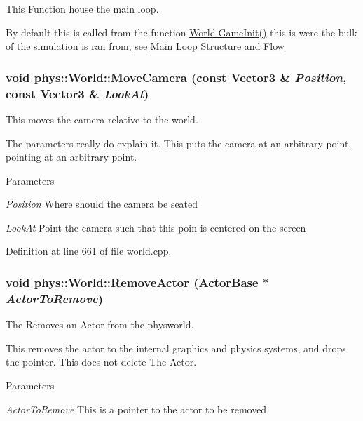 This Function house the main loop. 

By default this is called from the function \hyperlink{classphys_1_1World_a21cc36be08a61f40619584d4c438936b}{World.GameInit()} this is were the bulk of the simulation is ran from, see \hyperlink{mainloop1}{Main Loop Structure and Flow} \hypertarget{classphys_1_1World_aed87ebc1e559c3057132c50bba16117f}{
\subsubsection[{MoveCamera}]{\setlength{\rightskip}{0pt plus 5cm}void phys::World::MoveCamera (const {\bf Vector3} \& {\em Position}, \/  const {\bf Vector3} \& {\em LookAt})}}
\label{da/ddf/classphys_1_1World_aed87ebc1e559c3057132c50bba16117f}


This moves the camera relative to the world. 

The parameters really do explain it. This puts the camera at an arbitrary point, pointing at an arbitrary point. 
\begin{DoxyParams}{Parameters}
\item[{\em Position}]Where should the camera be seated \item[{\em LookAt}]Point the camera such that this poin is centered on the screen \end{DoxyParams}


Definition at line 661 of file world.cpp.

\hypertarget{classphys_1_1World_ab00f84983afcc7f6ef1e5a84367d994d}{
\subsubsection[{RemoveActor}]{\setlength{\rightskip}{0pt plus 5cm}void phys::World::RemoveActor ({\bf ActorBase} $\ast$ {\em ActorToRemove})}}
\label{da/ddf/classphys_1_1World_ab00f84983afcc7f6ef1e5a84367d994d}


The Removes an Actor from the physworld. 

This removes the actor to the internal graphics and physics systems, and drops the pointer. This does not delete The Actor. 
\begin{DoxyParams}{Parameters}
\item[{\em ActorToRemove}]This is a pointer to the actor to be removed \end{DoxyParams}



